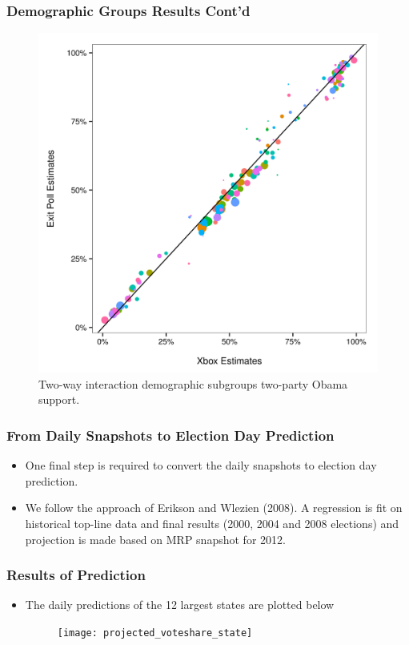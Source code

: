 \documentclass[xetex,mathserif,serif]{beamer}
\begin{document}
\begin{frame}
  \frametitle{Demographic Groups Results Cont'd}
  \begin{figure}[htbp]
    \centering
    \includegraphics[width=.6\textwidth]{"demo_groups_two_way_interaction"}
    \caption{Two-way interaction demographic subgroups two-party Obama support.}
  \end{figure}
\end{frame}

\begin{frame}
  \frametitle{From Daily Snapshots to Election Day Prediction}
  \begin{itemize}
  \item One final step is required to convert the daily snapshots to election day
    prediction.
  \item We follow the approach of Erikson and Wlezien (2008). A regression is fit
    on historical top-line data and final results (2000, 2004 and 2008 elections)
    and projection is made based on MRP snapshot for 2012. 
  \end{itemize}
\end{frame}


\begin{frame}
  \frametitle{Results of Prediction}
  \begin{itemize}
  \item The daily predictions of the 12 largest states are plotted below
    \begin{figure}[htbp]
      \centering
      \texttt{[image: projected\_voteshare\_state]}
    \end{figure}
  \end{itemize}
\end{frame}
\end{document}
